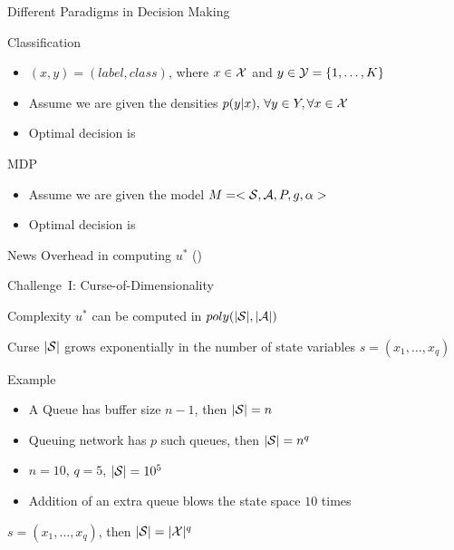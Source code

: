 \documentclass[10pt,handout]{beamer}
\begin{document}
\begin{frame}[fragile]{Different Paradigms in Decision Making}
\begin{block}{Classification}
\begin{itemize}
\item $(x,y)=(label,class)$, where $x\in \X$ and $y\in \Y=\{1,\ldots,K\}$
\item Assume we are given the densities $p(y|x),\,\forall y\in Y,\forall x\in \X$
\item Optimal decision is {}
\end{itemize}
\end{block}

\begin{block}{MDP}
\begin{itemize}
\item Assume we are given the model $M=<\S,\A,P,g,\alpha>$
\item Optimal decision is {}
\end{itemize}
\end{block}

\begin{block}{News}
\centering
Overhead in computing $u^*$ ({\color{orange}{We are not lucky here}})
\end{block}

\end{frame}


\begin{frame}[fragile]{Challenge~I: {Curse-of-Dimensionality}}
\begin{block}{Complexity \cite{littman1995complexity}}
 $u^*$ can be computed in $poly(|\S|,|\A|)$
\end{block}

\begin{block}{Curse}
$|\S|$ grows exponentially in the number of state variables $s=(x_1,\ldots, x_q)$
\end{block}
\begin{block}{Example}
\begin{itemize}
\item A Queue has buffer size $n-1$, then $|\S|=n$
\item Queuing network has $p$ such queues, then $|\S|=n^q$
\item $n=10$, $q=5$, $|\S|=10^5$
\item Addition of an extra queue blows the state space $10$ times
\end{itemize}
\end{block}
$s=(x_1,\ldots, x_q)$, then $|\S|=|\X|^q$
\end{frame}
\end{document}
